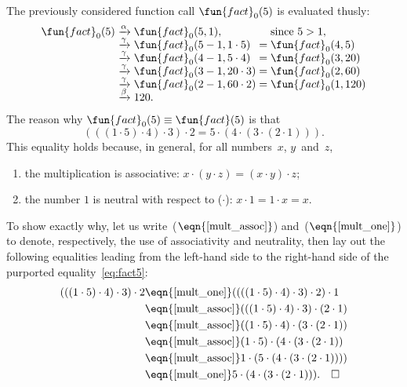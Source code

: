 The previously considered function call \(\fun{fact}_0(5)\) is
evaluated thusly:
\begin{equation*}
\begin{array}{r@{\;}c@{\;}l@{\;}c@{\;}l}
\fun{fact}_0(5)
& \xrightarrow{\smash[t]{\alpha}} & \fun{fact}_0(5,1),
&& \text{since \(5 > 1\)},\\
& \xrightarrow{\smash[t]{\gamma}} & \fun{fact}_0(5-1,1 \cdot 5)
& = & \fun{fact}_0(4,5)\\
& \xrightarrow{\smash[t]{\gamma}} & \fun{fact}_0(4-1,5 \cdot 4)
& = & \fun{fact}_0(3,20)\\
& \xrightarrow{\smash[t]{\gamma}} & \fun{fact}_0(3-1,20 \cdot 3)
& = & \fun{fact}_0(2,60)\\
& \xrightarrow{\smash[t]{\gamma}} & \fun{fact}_0(2-1,60 \cdot 2)
& = & \fun{fact}_0(1,120)\\
& \xrightarrow{\smash[t]{\beta}} & 120.
\end{array}
\end{equation*}
The reason why \(\fun{fact}_0(5) \equiv \fun{fact}(5)\) is that
\begin{equation}
  (((1 \cdot 5) \cdot 4) \cdot 3) \cdot 2
= 5 \cdot (4 \cdot (3 \cdot (2 \cdot 1))).\label{eq:fact5}
\end{equation}
This equality holds because, in general, for all numbers~\(x\),
\(y\)~and~\(z\),
\begin{enumerate}

\item \label{mult_assoc} the multiplication is associative: \(x \cdot
  (y \cdot z) = (x \cdot y) \cdot z\);

\item \label{mult_one} the number \(1\) is neutral with respect to
  (\(\cdot\)): \(x \cdot 1 = 1 \cdot x = x\).

\end{enumerate}
To show exactly why, let us write~(\(\eqn{\ref{mult_assoc}}\))
and~(\(\eqn{\ref{mult_one}}\)) to denote, respectively, the use of
associativity and neutrality, then lay out the following equalities
leading from the left\hyp{}hand side to the right\hyp{}hand side of
the purported equality~\eqref{eq:fact5}:
\begin{align*}
  (((1 \cdot 5) \cdot 4) \cdot 3) \cdot 2
  &\eqn{\smash{\ref{mult_one}}} ((((1 \cdot 5) \cdot 4) \cdot 3) \cdot
  2) \cdot 1\\
  &\eqn{\smash{\ref{mult_assoc}}} (((1 \cdot 5) \cdot 4) \cdot 3)
  \cdot (2 \cdot 1)\\
  &\eqn{\smash{\ref{mult_assoc}}} ((1 \cdot 5) \cdot 4) \cdot (3 \cdot (2
    \cdot 1))\\
  &\eqn{\smash{\ref{mult_assoc}}} (1 \cdot 5) \cdot (4 \cdot (3 \cdot
  (2 \cdot 1))\\
  &\eqn{\smash{\ref{mult_assoc}}} 1 \cdot (5 \cdot (4 \cdot (3 \cdot
  (2 \cdot 1))))\\
  &\eqn{\smash{\ref{mult_one}}} 5 \cdot (4 \cdot (3 \cdot (2 \cdot
  1))).\quad \Box
\end{align*}
